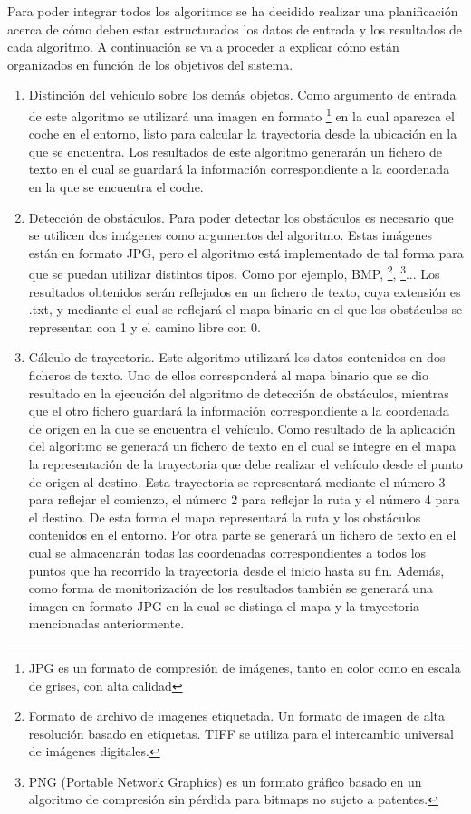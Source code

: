 Para poder integrar todos los algoritmos se ha decidido realizar una planificación acerca de cómo deben estar estructurados los datos de entrada y los resultados de cada algoritmo. A continuación se va a proceder a explicar cómo están organizados en función de los objetivos del sistema.

\begin{enumerate}
\item Distinción del vehículo sobre los demás objetos. Como argumento de entrada de este algoritmo se utilizará una imagen en formato \footnote{JPG es un formato de compresión de imágenes, tanto en color como en escala de grises, con alta calidad} en la cual aparezca el coche en el entorno, listo para calcular la trayectoria desde la ubicación en la que se encuentra. Los resultados de este algoritmo generarán un fichero de texto en el cual se guardará la información correspondiente a la coordenada en la que se encuentra el coche. 
\item Detección de obstáculos. Para poder detectar los obstáculos es necesario que se utilicen dos imágenes como argumentos del algoritmo. Estas imágenes están en formato \ac{JPG}, pero el algoritmo está implementado de tal forma para que se puedan utilizar distintos tipos. Como por ejemplo, \ac{BMP}, \footnote{Formato de archivo de imagenes etiquetada. Un formato de imagen de alta resolución basado en etiquetas. TIFF se utiliza para el intercambio universal de imágenes digitales.}, \footnote{PNG (Portable Network Graphics) es un formato gráfico basado en un algoritmo de compresión sin pérdida para bitmaps no sujeto a patentes.}... Los resultados obtenidos serán reflejados en un fichero de texto, cuya extensión es .txt, y mediante el cual se reflejará el mapa binario en el que los obstáculos se representan con 1 y el camino libre con 0. 
\item Cálculo de trayectoria. Este algoritmo utilizará los datos contenidos en dos ficheros de texto. Uno de ellos corresponderá al mapa binario que se dio resultado en la ejecución del algoritmo de detección de obstáculos, mientras que el otro fichero guardará la información correspondiente a la coordenada de origen en la que se encuentra el vehículo. Como resultado de la aplicación del algoritmo se generará un fichero de texto en el cual se integre en el mapa la representación de la trayectoria que debe realizar el vehículo desde el punto de origen al destino. Esta trayectoria se representará mediante el número 3 para reflejar el comienzo, el número 2 para reflejar la ruta y el número 4 para el destino. De esta forma el mapa representará la ruta y los obstáculos contenidos en el entorno. Por otra parte se generará un fichero de texto en el cual se almacenarán todas las coordenadas correspondientes a todos los puntos que ha recorrido la trayectoria desde el inicio hasta su fin. Además, como forma de monitorización de los resultados también se generará una imagen en formato \ac{JPG} en la cual se distinga el mapa y la trayectoria mencionadas anteriormente. 

\end{enumerate}
